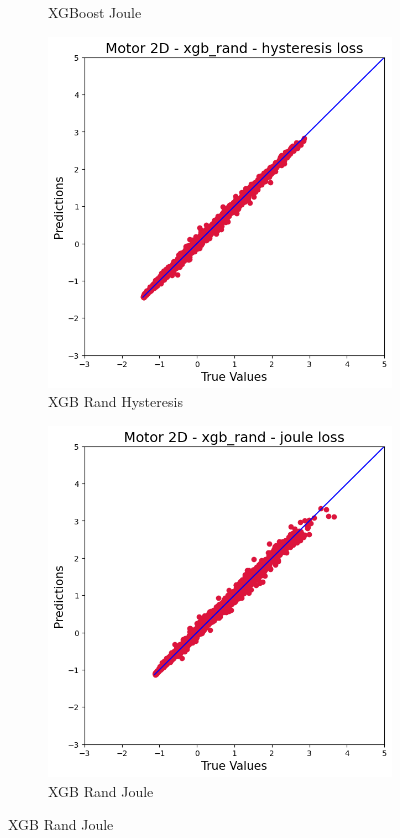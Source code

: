 \documentclass{article}
\begin{document}
\begin{figure}[!htbp]
\begin{subfigure}[b]{0.23\textwidth}
        \caption{XGBoost Joule}
    \end{subfigure}
    \hfill
    \begin{subfigure}[b]{0.23\textwidth}
        \centering
        \includegraphics[width=\textwidth]{images/2D/xgb_rand_hysteresis.png}
        \caption{XGB Rand Hysteresis}
    \end{subfigure}
    \hfill
    \begin{subfigure}[b]{0.23\textwidth}
        \centering
        \includegraphics[width=\textwidth]{images/2D/xgb_rand_joule.png}
        \caption{XGB Rand Joule}
    \end{subfigure}
    

\end{figure}
\end{document}
